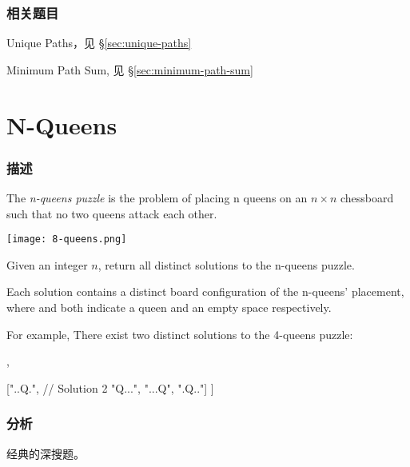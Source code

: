 \subsubsection{相关题目}
\begindot
\item Unique Paths，见 \S \ref{sec:unique-paths}
\item Minimum Path Sum, 见 \S \ref{sec:minimum-path-sum}
\myenddot


\section{N-Queens} %
\label{sec:n-queens}


\subsubsection{描述}
The \emph{n-queens puzzle} is the problem of placing n queens on an $n \times n$ chessboard such that no two queens attack each other.

\begin{center}
	\texttt{[image: 8-queens.png]}\\
	\label{fig:8-queens}
\end{center}

Given an integer $n$, return all distinct solutions to the n-queens puzzle.

Each solution contains a distinct board configuration of the n-queens' placement, where  and  both indicate a queen and an empty space respectively.

For example,
There exist two distinct solutions to the 4-queens puzzle:
\begin{Code}
	[
	[".Q..",  // Solution 1
	"...Q",
	"Q...",
	"..Q."],
	
	["..Q.",  // Solution 2
	"Q...",
	"...Q",
	".Q.."]
	]
\end{Code}


\subsubsection{分析}
经典的深搜题。

